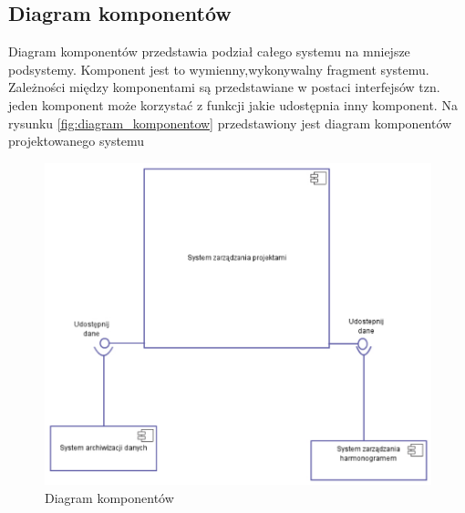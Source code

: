 \newpage
\subsection{Diagram komponentów}
\begin{adjustwidth}{2em}{0pt}
Diagram komponentów przedstawia podział całego systemu na mniejsze podsystemy. Komponent jest to wymienny,wykonywalny fragment systemu. Zależności między komponentami są przedstawiane w postaci interfejsów tzn. jeden komponent może korzystać z funkcji jakie udostępnia inny komponent. Na rysunku \ref{fig:diagram_komponentow} przedstawiony jest diagram komponentów projektowanego systemu

\begin{figure}[H]
    \centering
    \includegraphics[scale=1]{diagramy/sekwencji_i_komponentow/diagramKomponentow.pdf}
    \caption{Diagram komponentów}
    \label{fig:diagramKomponentow.pdf}
\end{figure} 

\end{adjustwidth}
\newpage